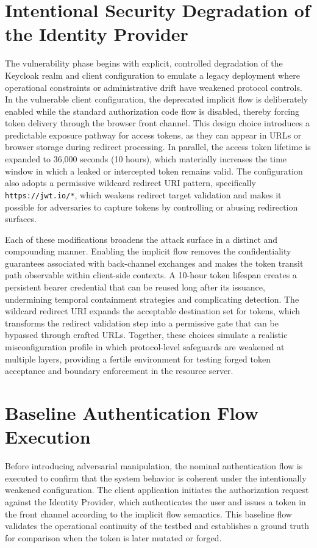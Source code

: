 \documentclass[11pt,a4paper]{report}
\begin{document}
\section{Intentional Security Degradation of the Identity Provider}
\label{sec:intentional-degrade}
The vulnerability phase begins with explicit, controlled degradation of the Keycloak realm and client configuration to emulate a legacy deployment where operational constraints or administrative drift have weakened protocol controls. In the vulnerable client configuration, the deprecated implicit flow is deliberately enabled while the standard authorization code flow is disabled, thereby forcing token delivery through the browser front channel. This design choice introduces a predictable exposure pathway for access tokens, as they can appear in URLs or browser storage during redirect processing. In parallel, the access token lifetime is expanded to 36,000 seconds (10 hours), which materially increases the time window in which a leaked or intercepted token remains valid. The configuration also adopts a permissive wildcard redirect URI pattern, specifically \texttt{https://jwt.io/*}, which weakens redirect target validation and makes it possible for adversaries to capture tokens by controlling or abusing redirection surfaces.

Each of these modifications broadens the attack surface in a distinct and compounding manner. Enabling the implicit flow removes the confidentiality guarantees associated with back-channel exchanges and makes the token transit path observable within client-side contexts. A 10-hour token lifespan creates a persistent bearer credential that can be reused long after its issuance, undermining temporal containment strategies and complicating detection. The wildcard redirect URI expands the acceptable destination set for tokens, which transforms the redirect validation step into a permissive gate that can be bypassed through crafted URLs. Together, these choices simulate a realistic misconfiguration profile in which protocol-level safeguards are weakened at multiple layers, providing a fertile environment for testing forged token acceptance and boundary enforcement in the resource server.

\section{Baseline Authentication Flow Execution}
\label{sec:baseline-flow}
Before introducing adversarial manipulation, the nominal authentication flow is executed to confirm that the system behavior is coherent under the intentionally weakened configuration. The client application initiates the authorization request against the Identity Provider, which authenticates the user and issues a token in the front channel according to the implicit flow semantics. This baseline flow validates the operational continuity of the testbed and establishes a ground truth for comparison when the token is later mutated or forged.
\end{document}
